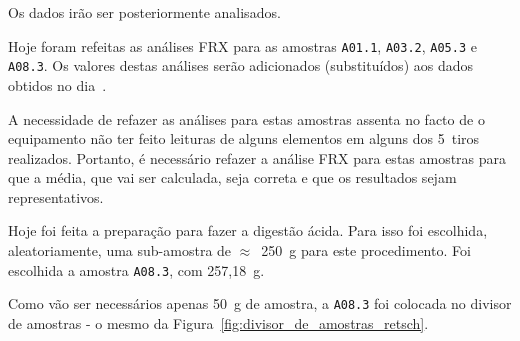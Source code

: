 

Os dados irão ser posteriormente analisados.

\hrulefill



Hoje foram refeitas as análises FRX para as amostras \texttt{A01.1}, \texttt{A03.2}, \texttt{A05.3} e \texttt{A08.3}.
Os valores destas análises serão adicionados (substituídos) aos dados obtidos no dia~.

A necessidade de refazer as análises para estas amostras assenta no facto de o equipamento não ter feito leituras de alguns elementos em alguns dos 5~tiros realizados.
Portanto, é necessário refazer a análise FRX para estas amostras para que a média, que vai ser calculada, seja correta e que os resultados sejam representativos.

\hrulefill

\label{day:7-novembro-2024}

Hoje foi feita a preparação para fazer a digestão ácida.
Para isso foi escolhida, aleatoriamente, uma sub-amostra de $\approx$~250~g para este procedimento.
Foi escolhida a amostra \texttt{A08.3}, com 257,18~g.

Como vão ser necessários apenas 50~g de amostra, a \texttt{A08.3} foi colocada no divisor de amostras - o mesmo da Figura~\ref{fig:divisor_de_amostras_retsch}.

